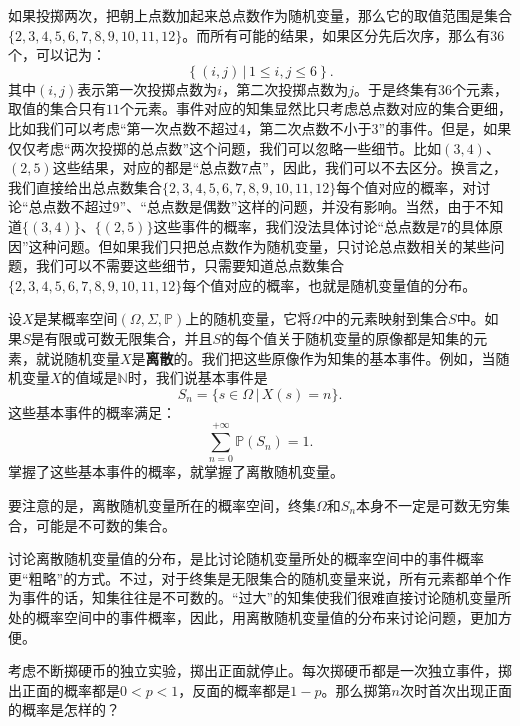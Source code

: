 \documentclass[12pt,UTF8,fontset=none]{ctexbook}
\begin{document}
如果投掷两次，把朝上点数加起来总点数作为随机变量，那么它的取值范围是集合$\{2,3,4,5,6,7,8,9,10,11,12\}$。而所有可能的结果，如果区分先后次序，那么有$36$个，可以记为：
$$ \left\{(i,j) \, | \, 1\leqslant i, j \leqslant 6\right\}. $$
其中$(i,j)$表示第一次投掷点数为$i$，第二次投掷点数为$j$。于是终集有$36$个元素，取值的集合只有$11$个元素。事件对应的知集显然比只考虑总点数对应的集合更细，比如我们可以考虑“第一次点数不超过$4$，第二次点数不小于$3$”的事件。但是，如果仅仅考虑“两次投掷的总点数”这个问题，我们可以忽略一些细节。比如$(3,4)$、$(2,5)$这些结果，对应的都是“总点数$7$点”，因此，我们可以不去区分。换言之，我们直接给出总点数集合$\{2,3,4,5,6,7,8,9,10,11,12\}$每个值对应的概率，对讨论“总点数不超过$9$”、“总点数是偶数”这样的问题，并没有影响。当然，由于不知道$\{(3,4)\}$、$\{(2,5)\}$这些事件的概率，我们没法具体讨论“总点数是$7$的具体原因”这种问题。但如果我们只把总点数作为随机变量，只讨论总点数相关的某些问题，我们可以不需要这些细节，只需要知道总点数集合$\{2,3,4,5,6,7,8,9,10,11,12\}$每个值对应的概率，也就是随机变量值的分布。

设$X$是某概率空间$(\Omega, \Sigma, \mathbb{P})$上的随机变量，它将$\Omega$中的元素映射到集合$S$中。如果$S$是有限或可数无限集合，并且$S$的每个值关于随机变量的原像都是知集的元素，就说随机变量$X$是\textbf{离散}的。我们把这些原像作为知集的基本事件。例如，当随机变量$X$的值域是$\mathbb{N}$时，我们说基本事件是
$$S_n =\{s \in \Omega \, | \, X(s) = n\}.$$
这些基本事件的概率满足：
$$ \sum_{n=0}^{+\infty} \mathbb{P}(S_n) = 1. $$
掌握了这些基本事件的概率，就掌握了离散随机变量。

要注意的是，离散随机变量所在的概率空间，终集$\Omega$和$S_n$本身不一定是可数无穷集合，可能是不可数的集合。

讨论离散随机变量值的分布，是比讨论随机变量所处的概率空间中的事件概率更“粗略”的方式。不过，对于终集是无限集合的随机变量来说，所有元素都单个作为事件的话，知集往往是不可数的。“过大”的知集使我们很难直接讨论随机变量所处的概率空间中的事件概率，因此，用离散随机变量值的分布来讨论问题，更加方便。

\begin{ex}
    考虑不断掷硬币的独立实验，掷出正面就停止。每次掷硬币都是一次独立事件，掷出正面的概率都是$0<p<1$，反面的概率都是$1-p$。那么掷第$n$次时首次出现正面的概率是怎样的？
\end{ex}
\end{document}
